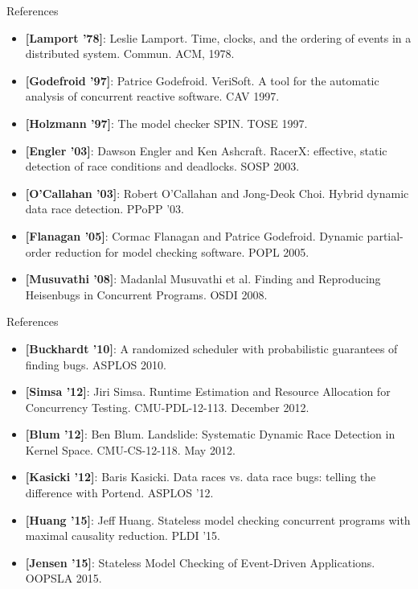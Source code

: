 \documentclass[xcolor=dvipsnames]{beamer}
\begin{document}
\begin{frame}{References}
	\small
	\begin{itemize}
		\item {\bf [Lamport '78]}:
			Leslie Lamport. Time, clocks, and the ordering of events in a distributed system.
			Commun. ACM, 1978.
		\item {\bf [Godefroid '97]}: Patrice Godefroid.
			VeriSoft. A tool for the automatic analysis of concurrent reactive software. CAV 1997.
		\item {\bf [Holzmann '97]}: The model checker SPIN. TOSE 1997.
		\item {\bf [Engler '03]}: Dawson Engler and Ken Ashcraft.
			RacerX: effective, static detection of race conditions and deadlocks. SOSP 2003.
		\item {\bf [O'Callahan '03]}: Robert O'Callahan and Jong-Deok Choi.
			Hybrid dynamic data race detection. PPoPP '03.
		\item {\bf [Flanagan '05]}: Cormac Flanagan and Patrice Godefroid. Dynamic partial-order reduction for
			model checking software. POPL 2005.
		\item {\bf [Musuvathi '08]}: Madanlal Musuvathi et al. Finding and Reproducing Heisenbugs in Concurrent
			Programs. OSDI 2008.
	\end{itemize}
\end{frame}
\begin{frame}{References}
	\small
	\begin{itemize}
		\item {\bf [Buckhardt '10]}: A randomized scheduler with probabilistic guarantees of finding bugs. ASPLOS 2010.
		\item {\bf [Simsa '12]}: Jiri Simsa. Runtime Estimation and Resource Allocation for
			Concurrency Testing. CMU-PDL-12-113. December 2012.
		\item {\bf [Blum '12]}: Ben Blum. Landslide: Systematic Dynamic Race Detection in Kernel
			Space. CMU-CS-12-118. May 2012.
		\item {\bf [Kasicki '12]}: Baris Kasicki. Data races vs. data race bugs: telling the difference with Portend. ASPLOS '12.
		\item {\bf [Huang '15]}: Jeff Huang. Stateless model checking concurrent programs with maximal causality reduction. PLDI '15.
		\item {\bf [Jensen '15]}: Stateless Model Checking of Event-Driven Applications. OOPSLA 2015.
	\end{itemize}
\end{frame}
\end{document}
